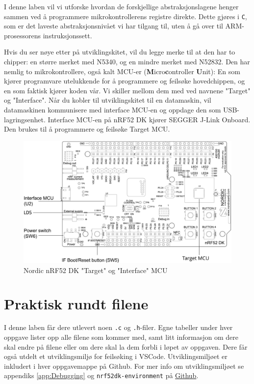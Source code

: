 \begin{alphasection}
I denne laben vil vi utforske hvordan de forskjellige abstraksjonslagene henger sammen ved å programmere mikrokontrollerens registre direkte. Dette gjøres i \verb|C|, som er det laveste abstraksjonsnivået vi har tilgang til, uten å gå over til ARM-prosessorens instruksjonssett.

Hvis du ser nøye etter på utviklingskitet, vil du legge merke til at den har to chipper: en større merket med N5340, og en mindre merket med N52832. Den har nemlig to mikrokontrollere, også kalt {MCU}-er (\textbf{M}icro\textbf{c}ontroller \textbf{U}nit): En som kjører programvare utelukkende for å programmere og feilsøke hovedchippen, og en som faktisk kjører koden vår. Vi skiller mellom dem med ved navnene "Target" og "Interface". Når du kobler til utviklingskitet til en datamaskin, vil datamaskinen kommunisere med interface MCU-en og oppdage den som USB-lagringsenhet. Interface MCU-en på nRF52 DK kjører SEGGER J-Link Onboard. Den brukes til å programmere og feilsøke Target MCU.


\begin{figure}[H]
    \centering
    \includegraphics[width=.8\linewidth]{figures/pca10040_interface_mcu.png}
    \caption{Nordic nRF52 DK "Target" og "Interface" MCU}
    \label{fig:interface-mcu}
\end{figure}

\section{Praktisk rundt filene}

I denne laben får dere utlevert noen \verb|.c| og \verb|.h|-filer. Egne tabeller under hver oppgave lister opp alle filene som kommer med, samt litt informasjon om dere skal endre på filene eller om dere skal la dem forbli i løpet av oppgaven. Dere får også utdelt et utviklingsmiljø for feilsøking i VSCode. Utviklingsmiljøet er inkludert i hver oppgavemappe på Github. For mer info om utviklingsmiljøet se appendiks \ref{app:Debugging} og \verb|nrf52dk-environment| på \href{https://github.com/ITK-TTK4235/nrf52dk-environment}{Github}. 



\end{alphasection}
